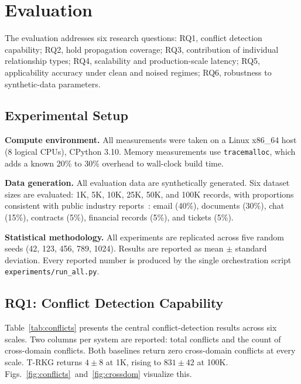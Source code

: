 \documentclass{ieeeaccess}
\begin{document}
\section{Evaluation}
\label{sec:eval}

The evaluation addresses six research questions: RQ1, conflict detection capability; RQ2, hold propagation coverage; RQ3, contribution of individual relationship types; RQ4, scalability and production-scale latency; RQ5, applicability accuracy under clean and noised regimes; RQ6, robustness to synthetic-data parameters.

\subsection{Experimental Setup}

\textbf{Compute environment.} All measurements were taken on a Linux x86\_64 host (8 logical CPUs), CPython 3.10. Memory measurements use \texttt{tracemalloc}, which adds a known 20\% to 30\% overhead to wall-clock build time.

\textbf{Data generation.} All evaluation data are synthetically generated. Six dataset sizes are evaluated: 1K, 5K, 10K, 25K, 50K, and 100K records, with proportions consistent with public industry reports~\cite{databerg,igrm}: email (40\%), documents (30\%), chat (15\%), contracts (5\%), financial records (5\%), and tickets (5\%).

\textbf{Statistical methodology.} All experiments are replicated across five random seeds (42, 123, 456, 789, 1024). Results are reported as mean $\pm$ standard deviation. Every reported number is produced by the single orchestration script \texttt{experiments/run\_all.py}.

\subsection{RQ1: Conflict Detection Capability}
\label{sec:rq1}

Table~\ref{tab:conflicts} presents the central conflict-detection results across six scales. Two columns per system are reported: total conflicts and the count of cross-domain conflicts. Both baselines return zero cross-domain conflicts at every scale. T-RKG returns $4 \pm 8$ at 1K, rising to $831 \pm 42$ at 100K. Figs.~\ref{fig:conflicts}~and~\ref{fig:crossdom} visualize this.
\end{document}
